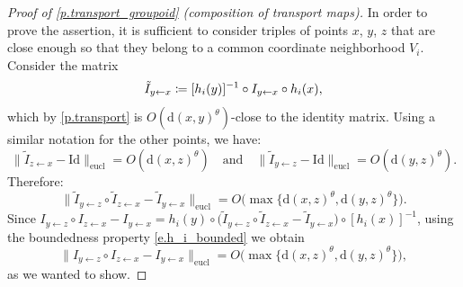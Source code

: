 \documentclass[JEP,XML,SOM,Unicode]{cedram}
\def\vcentcolon{\mathrel{\mathop\ordinarycolon}}
\providecommand\ordinarycolon{:}
\providecommand*\coloneqq{\vcentcolon\mathrel{\mkern-1.2mu}=}
\theoremstyle{plain}
\theoremstyle{definition}
\newcommand{\dd}{\mathrm{d}}
\begin{document}
\begin{proof}[Proof of \cref{p.transport_groupoid} (composition of transport maps)]
In order to prove the assertion, it is sufficient to consider triples of points $x$, $y$, $z$ that are close enough so that they belong to a common coordinate neighborhood $V_i$. Consider the matrix
\begin{equation}\label{e.tilde_I}
\tilde I_{y \gets x} \coloneqq [h_i(y)]^{-1} \circ I_{y \gets x} \circ h_i(x),
\end{equation}
which by \cref{p.transport} is $O(\dd(x,y)^\theta)$-close to the identity matrix.
Using a similar notation for the other points, we have:
\[
\| \tilde I_{z \gets x} - \mathrm{Id} \|_\mathrm{eucl} = O(\dd(x,z)^\theta) \quad \text{and} \quad
\| \tilde I_{y \gets z} - \mathrm{Id} \|_\mathrm{eucl} = O(\dd(y,z)^\theta).
\]
Therefore:
\[
\| \tilde I_{y \gets z} \circ \tilde I_{z \gets x} - \tilde I_{y \gets x} \|_\mathrm{eucl} = O \big( \max\{ \dd(x,z)^\theta, \dd(y,z)^\theta \} \big).
\]
Since $I_{y \gets z} \circ I_{z \gets x} - I_{y \gets x} = h_i(y) \circ \big( \tilde I_{y \gets z} \circ \tilde I_{z \gets x} - \tilde I_{y \gets x} \big) \circ [h_i(x)]^{-1}$, using the boundedness property \eqref{e.h_i_bounded} we obtain
\[
\| I_{y \gets z} \circ I_{z \gets x} - I_{y \gets x} \|_\mathrm{eucl} = O \big( \max\{ \dd(x,z)^\theta, \dd(y,z)^\theta \} \big),
\]
as we wanted to show.
\end{proof}
\end{document}
